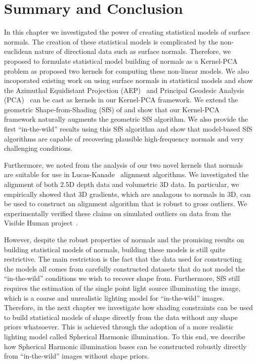 \section{Summary and Conclusion}\label{sec:singl_img_summary}
In this chapter we investigated the power of creating statistical models
of surface normals. The creation of these statistical models is complicated
by the non-euclidean nature of directional data such as surface normals.
Therefore, we proposed to formulate statistical model building of normals
as a Kernel-PCA problem as proposed two kernels for computing these non-linear
models. We also incoporated existing work on using surface normals in 
statistical models and show the 
Azimuthal Equidistant Projection (AEP)~\cite{smith2006recovering} and
Principal Geodesic Analysis (PCA)~\cite{smith2008facial} can be cast as 
kernels in our Kernel-PCA framework. We extend the geometric 
Shape-from-Shading (SfS) of \citet{smith2006recovering} and show that our 
Kernel-PCA framework naturally augments the geometric SfS algorithm. We also
provide the first ``in-the-wild'' results using this SfS algorithm and show
that model-based SfS algorithms are capable of recovering plausible high-frequency
normals and very challenging conditions.

Furthermore, we noted from the analysis of our two novel kernels that normals
are suitable for use in Lucas-Kanade~\cite{lucas1981iterative} alignment
algorithms. We investigated the alignment of both 2.5D depth data and volumetric
3D data. In particular, we empirically showed that 3D gradients, which are
analagous to normals in 3D, can be used to construct an alignment algorithm
that is robust to gross outliers. We experimentally verified these claims
on simulated outliers on data from the 
Visible Human project~\cite{spitzer1996visiblehuman}.

However, despite the robust properties of normals and the promising results
on building statistical models of normals, building these models is still
quite restrictive. The main restriction is the fact that the data used
for constructing the models all comes from carefully constructed datasets
that do not model the ``in-the-wild'' conditions we wish to recover shape
from. Furthermore, SfS still requires the estimation of the single point light 
source illuminating the image, which is a coarse and unrealistic lighting
model for ``in-the-wild'' images. Therefore, in the next chapter we investigate
how shading constraints can be used to build statistical models of shape
directly from the data without any shape priors whatsoever. This is achieved
through the adoption of a more realistic lighting model called Spherical
Harmonic illumination. To this end, we describe how Spherical Harmonic illumination
bases can be constructed robustly directly from ``in-the-wild'' images
without shape priors.